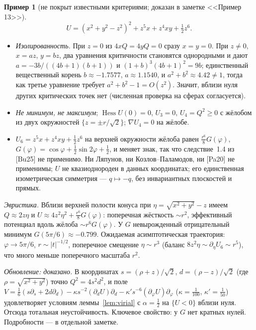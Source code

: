\documentclass[11pt,a4paper]{article}
\theoremstyle{definition}
\newtheorem{example}[theorem]{Пример}
\DeclareMathOperator{\Hess}{Hess}
\begin{document}
\begin{example}[не покрыт известными критериями; доказан в заметке <<Пример 13>>]\label{ex:hard}
\[
U=(x^2+y^2-z^2)^2+z^5x+z^4xy+\tfrac12 z^6 .
\]
\begin{itemize}[leftmargin=*]
\item \emph{Изолированность.} При $z=0$ из $4xQ=4yQ=0$ сразу $x=y=0$. При $z\ne0$, $x=az$, $y=bz$, два
уравнения критичности становятся однородными и дают $a=-3b/((4b+1)(b+1))$ и
$(1+b)^3(4b+1)^2=9b$; единственный вещественный корень $b\approx-1.7577$, $a\approx1.1540$, и
$a^2+b^2\approx4.42\ne1$, тогда как третье уравнение требует $a^2+b^2-1=O(z^2)$. Значит, вблизи нуля
других критических точек нет (численная проверка на сферах согласуется).
\item \emph{Не минимум, не максимум}; $\Hess U(0)=0$, $U_3=0$, $U_4=Q^2\ge0$ с жёлобом из двух окружностей
$\{z=\pm r/\sqrt2\}$; $\nabla U_4=0$ на жёлобе.
\item $U_6=z^5x+z^4xy+\frac12z^6$ на верхней окружности жёлоба равен
$\frac{r^6}{8}G(\varphi)$, $G(\varphi)=\cos\varphi+\frac12\sin2\varphi+\frac12$, и меняет знак, так что
следствие~1.4 из [Bu25] не применимо. Ни Ляпунов, ни Козлов--Паламодов, ни [Pa20] не применимы; $U$ не
квазиоднороден в данных координатах; его единственная изометрическая симметрия --- $q\mapsto-q$, без
инвариантных плоскостей и прямых.
\end{itemize}
\emph{Эвристика.} Вблизи верхней полости конуса при $\eta=\sqrt{x^2+y^2}-z$ имеем
$Q\approx2z\eta$ и $U\approx4z^2\eta^2+\frac{r^6}{8}G(\varphi)$: поперечная жёсткость $\sim r^2$,
эффективный потенциал вдоль жёлоба $\sim r^6G(\varphi)$. У $G$ невырожденный отрицательный минимум
$G(5\pi/6)\approx-0.799$. Ожидаемая асимптотическая траектория: $\varphi\to5\pi/6$, $r\sim|t|^{-1/2}$,
поперечное смещение $\eta\sim r^3$ (баланс $8z^2\eta\sim\partial_\eta U_6\sim r^5$), что много меньше
поперечного масштаба $r^2$.

\emph{Обновление: доказано.} В координатах $s=(\rho+z)/\sqrt2$, $d=(\rho-z)/\sqrt2$ (где $\rho=\sqrt{x^2+y^2}$)
точно $Q^2=4s^2d^2$, и поле
$V=\frac16(s\partial_s+2d\partial_d)-\kappa s^{-2}(\partial_dU)\partial_d-\kappa' s^{-6}(\partial_\varphi U)\partial_\varphi$
($\kappa=\frac1{100}$, $\kappa'=\frac1{50}$) удовлетворяет условиям леммы~\ref{lem:virial} с $\alpha=\frac12$ на
$\{U<0\}$ вблизи нуля. Отсюда тотальная неустойчивость. Ключевое свойство: у $G$ нет кратных нулей.
Подробности --- в отдельной заметке.
\end{example}
\end{document}
